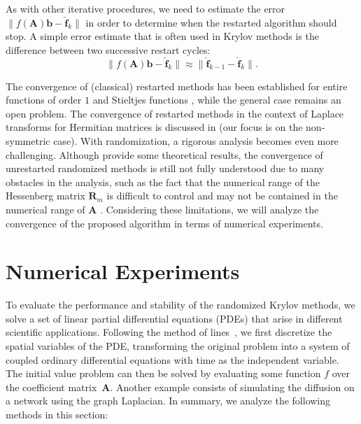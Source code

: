\documentclass[smallextended]{svjour3}
\renewcommand{\vec}[1]{\mathbf{#1}}
\newcommand{\mat}[1]{\mathbf{#1}}
\newcommand{\norm}[1]{\| #1 \|}
\begin{document}
As with other iterative procedures, we need to estimate the error $\norm{f(\mat{A})\vec{b} - \vec{\hat{f}}_k}$ in order to determine when the restarted algorithm should stop. A simple error estimate that is often used in Krylov methods is the difference between two successive restart cycles:
\begin{equation*}
\norm{f(\mat{A})\vec{b} - \vec{\hat{f}}_k} \approx \norm{\vec{\hat{f}}_{k - 1} - \vec{\hat{f}}_k}.
\end{equation*}

The convergence of (classical) restarted methods has been established for entire functions of order $1$ \cite[Theorem 4.2]{eiermann_restarted_2006} and Stieltjes functions \cite{frommer_convergence_2014}, while the general case remains an open problem. The convergence of restarted methods in the context of Laplace transforms for Hermitian matrices is discussed in \cite{tsolakis_efficient_2023} (our focus is on the non-symmetric case). With randomization, a rigorous analysis becomes even more challenging. Although \cite{cortinovis_speeding_2024,guttel_randomized_2023,palitta_sketched_2025} provide some theoretical results, the convergence of unrestarted randomized methods is still not fully understood due to many obstacles in the analysis, such as the fact that the numerical range of the Hessenberg matrix $\mat{R}_{m}$ is difficult to control and may not be contained in the numerical range of $\mat{A}$ \cite{grigori_restoring_2026,palitta_sketched_2025}. Considering these limitations, we will analyze the convergence of the proposed algorithm in terms of numerical experiments.

\section{Numerical Experiments}
\label{sec:numerical}

To evaluate the performance and stability of the randomized Krylov methods, we solve a set of linear partial differential equations (PDEs) that arise in different scientific applications. Following the method of lines~\cite{schiesser_numerical_1991}, we first discretize the spatial variables of the PDE, transforming the original problem into a system of coupled ordinary differential equations with time as the independent variable. The initial value problem can then be solved by evaluating some function $f$ over the coefficient matrix~$\mat{A}$. Another example consists of simulating the diffusion on a network using the graph Laplacian. In summary, we analyze the following methods in this section:
\end{document}
